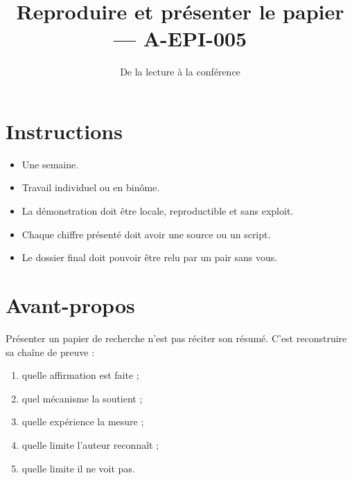 \documentclass{training}
\begin{document}
\title{Reproduire et présenter le papier --- A-EPI-005}
\subtitle{De la lecture à la conférence}
\maketitle

\newpage
\tableofcontents
\newpage

\chapter{Instructions}
\begin{itemize}
  \item Une semaine.
  \item Travail individuel ou en binôme.
  \item La démonstration doit être locale, reproductible et sans exploit.
  \item Chaque chiffre présenté doit avoir une source ou un script.
  \item Le dossier final doit pouvoir être relu par un pair sans vous.
\end{itemize}





\chapter{Avant-propos}

Présenter un papier de recherche n'est pas réciter son résumé. C'est
reconstruire sa chaîne de preuve :

\begin{enumerate}
  \item quelle affirmation est faite ;
  \item quel mécanisme la soutient ;
  \item quelle expérience la mesure ;
  \item quelle limite l'auteur reconnaît ;
  \item quelle limite il ne voit pas.
\end{enumerate}
\end{document}
